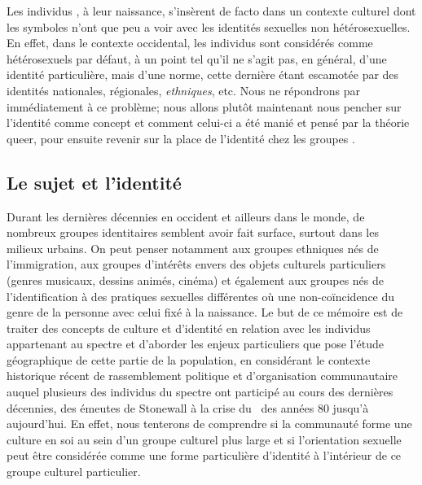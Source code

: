 Les individus \lgbt{}, à leur naissance, s'insèrent de facto dans un contexte culturel dont les symboles n'ont que peu a voir avec les identités sexuelles non hétérosexuelles. 
En effet, dans le contexte occidental, les individus sont considérés comme hétérosexuels par défaut, à un point tel qu'il ne s'agit pas, en général, d'une identité particulière, mais d'une norme, cette dernière étant escamotée par des identités nationales, régionales, \emph{ethniques}, etc.
Nous ne répondrons par immédiatement à ce problème; nous allons plutôt maintenant nous pencher sur l'identité comme concept et comment celui-ci a été manié et pensé par la théorie queer, pour ensuite revenir sur la place de l'identité chez les groupes \lgbt{}.

\subsection{Le sujet et l'identité}
\label{subsec:sujet_et_identité} Durant les dernières décennies en occident et ailleurs dans le monde, de nombreux groupes identitaires semblent avoir fait surface, surtout dans les milieux urbains. 
On peut penser notamment aux groupes ethniques nés de l'immigration, aux groupes d'intérêts envers des objets culturels particuliers (genres musicaux, dessins animés, cinéma) et également aux groupes nés de l'identification à des pratiques sexuelles différentes où une non-coïncidence du genre de la personne avec celui fixé à la naissance. 
Le but de ce mémoire est de traiter des concepts de culture et d'identité en relation avec les individus appartenant au spectre \lgbt{} et d'aborder les enjeux particuliers que pose l'étude géographique de cette partie de la population, en considérant le contexte historique récent de rassemblement politique et d'organisation communautaire auquel plusieurs des individus du spectre \lgbt{} ont participé au cours des dernières décennies, des émeutes de Stonewall à la crise du \sida\ des années 80 jusqu'à aujourd'hui. 
En effet, nous tenterons de comprendre si la communauté \lgbt{} forme une culture en soi au sein d'un groupe culturel plus large et si l'orientation sexuelle peut être considérée comme une forme particulière d'identité à l'intérieur de ce groupe culturel particulier. 

